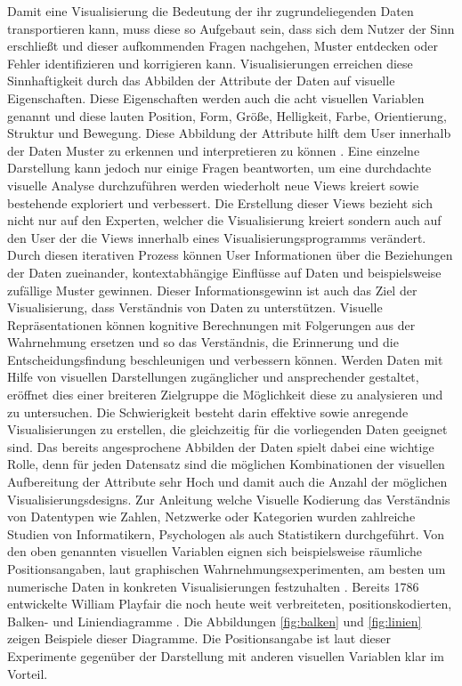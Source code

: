 \documentclass[draft=false
              ,paper=a4
              ,twoside=false
              ,fontsize=11pt
              ,headsepline
              ,BCOR10mm
              ,DIV11
              ]{scrbook}
\begin{document}
Damit eine Visualisierung die Bedeutung der ihr zugrundeliegenden Daten transportieren kann, muss diese so Aufgebaut sein, dass sich dem Nutzer der Sinn erschließt und dieser aufkommenden Fragen nachgehen, Muster entdecken oder Fehler identifizieren und korrigieren kann. Visualisierungen erreichen diese Sinnhaftigkeit durch das Abbilden der Attribute der Daten auf visuelle Eigenschaften. Diese Eigenschaften werden auch die acht visuellen Variablen genannt \cite{ward_interactive_2010} und diese lauten Position, Form, Größe, Helligkeit, Farbe, Orientierung, Struktur und Bewegung. Diese Abbildung der Attribute hilft dem User innerhalb der Daten Muster zu erkennen und interpretieren zu können \cite{card_readings_1999}. Eine einzelne Darstellung kann jedoch nur einige Fragen beantworten, um eine durchdachte visuelle Analyse durchzuführen werden wiederholt neue Views kreiert sowie bestehende exploriert und verbessert. Die Erstellung dieser Views bezieht sich nicht nur auf den Experten, welcher die Visualisierung kreiert sondern auch auf den User der die Views innerhalb eines Visualisierungsprogramms verändert. Durch diesen iterativen Prozess können User Informationen über die Beziehungen der Daten zueinander, kontextabhängige Einflüsse auf Daten und beispielsweise zufällige Muster gewinnen. Dieser Informationsgewinn ist auch das Ziel der Visualisierung, dass Verständnis von Daten zu unterstützen. Visuelle Repräsentationen können kognitive Berechnungen mit Folgerungen aus der Wahrnehmung ersetzen und so das Verständnis, die Erinnerung und die Entscheidungsfindung beschleunigen und verbessern können. Werden Daten mit Hilfe von visuellen Darstellungen zugänglicher und ansprechender gestaltet, eröffnet dies einer breiteren Zielgruppe die Möglichkeit diese zu analysieren und zu untersuchen. Die Schwierigkeit besteht darin effektive sowie anregende Visualisierungen zu erstellen, die gleichzeitig für die vorliegenden Daten geeignet sind.
Das bereits angesprochene Abbilden der Daten spielt dabei eine wichtige Rolle, denn für jeden Datensatz sind die möglichen Kombinationen der visuellen Aufbereitung der Attribute sehr Hoch und damit auch die Anzahl der möglichen Visualisierungsdesigns. Zur Anleitung welche Visuelle Kodierung das Verständnis von Datentypen wie Zahlen, Netzwerke oder Kategorien wurden zahlreiche Studien von Informatikern, Psychologen als auch Statistikern durchgeführt. Von den oben genannten visuellen Variablen eignen sich beispielsweise räumliche Positionsangaben, laut graphischen Wahrnehmungsexperimenten, am besten um numerische Daten in konkreten Visualisierungen festzuhalten \cite{heer_tour_2010}. Bereits 1786 entwickelte William Playfair die noch heute weit verbreiteten, positionskodierten, Balken- und Liniendiagramme \cite{playfair_playfairs_1768}. Die Abbildungen \ref{fig:balken} und \ref{fig:linien} zeigen Beispiele dieser Diagramme. Die Positionsangabe ist laut dieser Experimente gegenüber der Darstellung mit anderen visuellen Variablen klar im Vorteil. 
\end{document}
